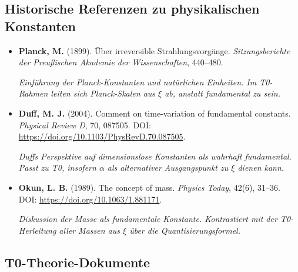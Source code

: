 	\subsection{Historische Referenzen zu physikalischen Konstanten}
	
	\begin{itemize}
		\item \textbf{Planck, M.} (1899). Über irreversible Strahlungsvorgänge. \textit{Sitzungsberichte der Preußischen Akademie der Wissenschaften}, 440--480. 
		
		\textit{Einführung der Planck-Konstanten und natürlichen Einheiten. Im T0-Rahmen leiten sich Planck-Skalen aus $\xi$ ab, anstatt fundamental zu sein.}
		
		\item \textbf{Duff, M. J.} (2004). Comment on time-variation of fundamental constants. \textit{Physical Review D}, 70, 087505. DOI: \url{https://doi.org/10.1103/PhysRevD.70.087505}. 
		
		\textit{Duffs Perspektive auf dimensionslose Konstanten als wahrhaft fundamental. Passt zu T0, insofern $\alpha$ als alternativer Ausgangspunkt zu $\xi$ dienen kann.}
		
		\item \textbf{Okun, L. B.} (1989). The concept of mass. \textit{Physics Today}, 42(6), 31--36. DOI: \url{https://doi.org/10.1063/1.881171}. 
		
		\textit{Diskussion der Masse als fundamentale Konstante. Kontrastiert mit der T0-Herleitung aller Massen aus $\xi$ über die Quantisierungsformel.}
	\end{itemize}
	
	\subsection{T0-Theorie-Dokumente}
	
